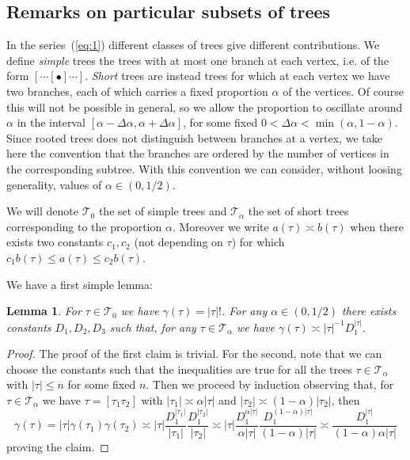 \documentclass[a4paper,12pt,reqno]{amsart}
\newcommand{\1}{{\bf 1}}
\newtheorem{lemma}[theorem]{Lemma}
\newcommand{\TT}{\mathcal{T}}
\begin{document}
\subsection{Remarks on particular subsets of trees}
\label{sec:remarks}
In the series~(\ref{eq:1}) different classes of trees give different
contributions. We define \emph{simple} trees the trees with at most
one branch at each vertex, i.e. of the form $[\cdots [\bullet]\cdots
]$. \emph{Short} trees are instead trees for which at  each  vertex we
have two branches, each of which carries a fixed proportion $\alpha$ of the
vertices. Of course this will not be possible in general, so we allow
the proportion to oscillate around $\alpha$ in the interval
$[\alpha-\Delta \alpha, \alpha + \Delta \alpha]$, for some fixed $0 <
\Delta \alpha < \min(\alpha,1-\alpha)$. Since rooted trees does not
distinguish between branches at a vertex, we take here the convention
that the branches are ordered by the number of vertices in the
corresponding subtree. With this convention we can consider, without
loosing generality, values of $\alpha \in (0,1/2)$.

We will denote $\TT_0$ the set of simple trees and $\TT_\alpha$ the
set  of short trees corresponding to the proportion $\alpha$. Moreover we write $a(\tau) \asymp b(\tau)$ when there exists two constants $c_1,c_2$ (not depending on $\tau$) for which $c_1 b(\tau) \le a (\tau) \le c_2 b(\tau)$.

  We have a
first simple lemma:
\begin{lemma}
\label{lemma:comb}
For $\tau \in \TT_0$ we have $\gamma(\tau) = |\tau|!$. For any $\alpha
\in (0,1/2)$ there exists constants $D_1,D_2,D_3$ such that, for any
$\tau \in \TT_\alpha$ we have
$
\gamma(\tau)  \asymp |\tau|^{-1} D_1^{|\tau|}
$.  
\end{lemma}
\begin{proof}
The proof of the first claim is trivial. For the second, note that we
can choose the constants such that the inequalities are true for all
the trees $\tau \in \TT_\alpha$  with $|\tau| \le n$ for some fixed
$n$. Then we proceed by induction observing that, for $\tau \in
\TT_\alpha$ we have $\tau = [\tau_1 \tau_2]$ with $|\tau_1| \asymp
\alpha |\tau|$ and $|\tau_2| \asymp (1-\alpha) |\tau_2|$, then
$$
\gamma(\tau) = |\tau| \gamma(\tau_1) \gamma(\tau_2) \asymp |\tau|
\frac{D_1^{|\tau_1|}}{|\tau_1|}  \frac{D_1^{|\tau_2|}}{|\tau_2|}
\asymp
|\tau| \frac{D_1^{\alpha|\tau|}}{\alpha|\tau|}
\frac{D_1^{(1-\alpha)|\tau|}}{(1-\alpha)|\tau|}
\asymp  \frac{D_1^{|\tau|}}{(1-\alpha) \alpha|\tau|}
$$
proving the claim.
\end{proof}
\end{document}

